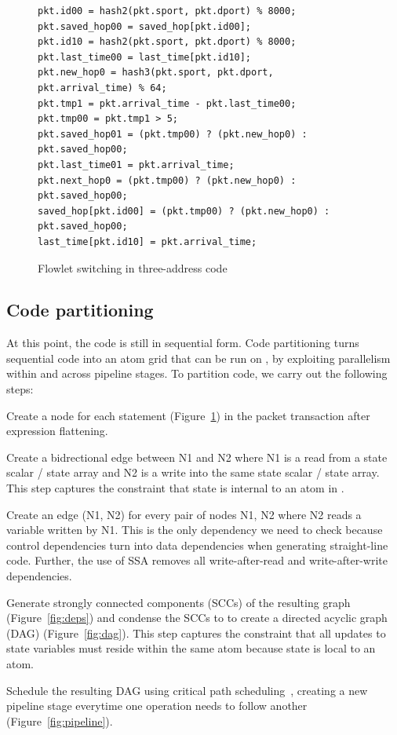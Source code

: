 \begin{figure}[!h]
  \begin{lstlisting}[style=customc]
pkt.id00 = hash2(pkt.sport, pkt.dport) % 8000;
pkt.saved_hop00 = saved_hop[pkt.id00];
pkt.id10 = hash2(pkt.sport, pkt.dport) % 8000;
pkt.last_time00 = last_time[pkt.id10];
pkt.new_hop0 = hash3(pkt.sport, pkt.dport, pkt.arrival_time) % 64;
pkt.tmp1 = pkt.arrival_time - pkt.last_time00;
pkt.tmp00 = pkt.tmp1 > 5;
pkt.saved_hop01 = (pkt.tmp00) ? (pkt.new_hop0) : pkt.saved_hop00;
pkt.last_time01 = pkt.arrival_time;
pkt.next_hop0 = (pkt.tmp00) ? (pkt.new_hop0) : pkt.saved_hop00;
saved_hop[pkt.id00] = (pkt.tmp00) ? (pkt.new_hop0) : pkt.saved_hop00;
last_time[pkt.id10] = pkt.arrival_time;
\end{lstlisting}
\caption{Flowlet switching in three-address code}
\label{fig:three_address}
\end{figure}

\subsection{Code partitioning}
\label{ss:partitioning}
At this point, the code is still in sequential form. Code partitioning
turns sequential code into an atom grid that can be run on \absmachine , by
exploiting parallelism within and across pipeline stages.
To partition code, we carry out the following steps:
\begin{CompactEnumerate}
  \item Create a node for each statement (Figure~\ref{fig:three_address}) in
    the packet transaction after expression flattening.
  \item Create a bidrectional edge between N1 and N2 where N1 is a read from a
    state scalar / state array and N2 is a write into the same state scalar /
    state array. This step captures the constraint that state is internal to an
    atom in \absmachine.
  \item Create an edge (N1, N2) for every pair of nodes N1, N2 where N2 reads
    a variable written by N1. This is the only dependency we need to check because
    control dependencies turn into data dependencies when generating straight-line
    code. Further, the use of SSA removes all write-after-read and write-after-write
    dependencies.
  \item Generate strongly connected components (SCCs) of the resulting graph
    (Figure~\ref{fig:deps}) and condense the SCCs to to create a directed
    acyclic graph (DAG) (Figure~\ref{fig:dag}). This step captures the
    constraint that all updates to state variables must reside within the same
    atom because state is local to an atom.
  \item Schedule the resulting DAG using critical path
    scheduling~\cite{crit_path_sched}, creating a new pipeline stage everytime
    one operation needs to follow another (Figure~\ref{fig:pipeline}).
\end{CompactEnumerate}

